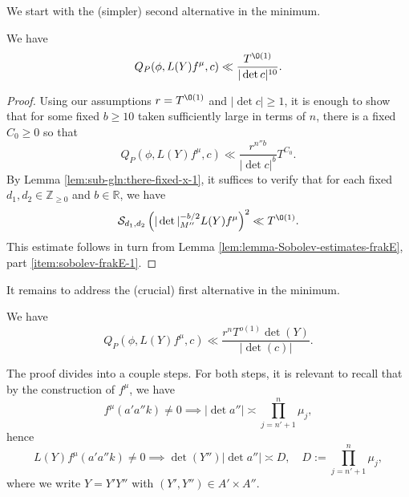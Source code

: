 We start with the (simpler) second alternative in the minimum.
\begin{lemma}\label{lem:standard:we-have-begin-first-alternative}
  We have
  \begin{equation*}
    Q_P(\phi, L(Y) f^\mu , c)
    \ll
    \frac{T^{\O(1)}}{|\det c|^{10}}.
  \end{equation*}
\end{lemma}
\begin{proof}
  Using our assumptions $r = T^{\O(1)}$ and $\lvert \det c \rvert \geq 1$, it is enough to show that for some fixed $b \geq 10$ taken sufficiently large in terms of $n$, there is a fixed $C_0 \geq 0$ so that
  \begin{equation*}
    Q_P(\phi, L(Y) f^\mu, c) \ll
    \frac{r^{n'' b}}{|\det c|^{b}} T^{C_0}.
  \end{equation*}
  By Lemma \ref{lem:sub-gln:there-fixed-x-1}, it suffices to verify that for each fixed $d_{1}, d_2 \in \mathbb{Z}_{\geq 0}$ and $b \in \mathbb{R}$, we have
  \begin{equation}\label{eq:mathc-d_2-left}
    \mathcal{S}_{d_1,d_2} \left(
      |\det|_{M''}^{-b/2} L(Y) f^\mu
    \right)^2 \ll T^{\O(1)}.
  \end{equation}
  This estimate follows in turn from Lemma \ref{lem:lemma-Sobolev-estimates-frakE}, part \eqref{item:sobolev-frakE-1}.
\end{proof}

It remains to address the (crucial) first alternative in the minimum.
\begin{proposition}\label{prop:standard:we-have-begin-second-alternative}
  We have
  \begin{equation}\label{eq:qpphi-ly-fmu}
    Q_P(\phi, L(Y) f^\mu , c)
    \ll
    \frac{r^n T^{o(1)} \det(Y)}{|\det (c)|}.
  \end{equation}
\end{proposition}
The proof divides into a couple steps.  For both steps, it is relevant to recall that by the construction of $f^\mu$, we have
\begin{equation*}
  f^\mu (a' a'' k) \neq 0 \implies |\det a''| \asymp \prod_{j=n' + 1}^{n} \mu_j,
\end{equation*}
hence
\begin{equation}\label{eq:ly-fmua-a}
  L(Y) f^\mu(a' a'' k) \neq 0 \implies  \det(Y'') |\det a''| \asymp D , \quad D := \prod_{j=n'+1}^{n} \mu_j,
\end{equation}
where we write $Y = Y' Y''$ with $(Y', Y'') \in A' \times A''$.

